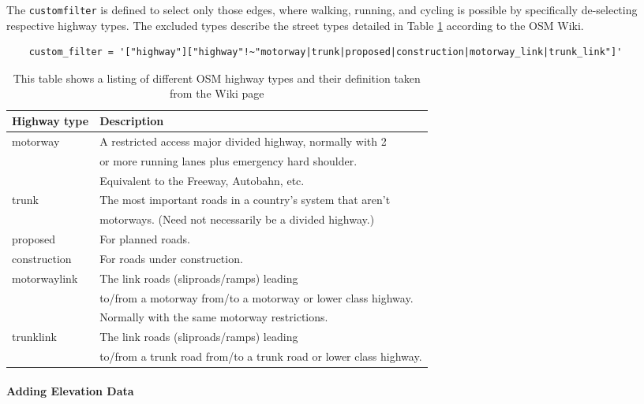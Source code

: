 The \texttt{custom\textunderscore filter} is defined to select only those edges, where walking, running, and cycling is possible by specifically de-selecting respective highway types.
The excluded types describe the street types detailed in Table \ref{tab:osmHighwayTypes} according to the OSM Wiki.

\begin{lstlisting}
	custom_filter = '["highway"]["highway"!~"motorway|trunk|proposed|construction|motorway_link|trunk_link"]'
\end{lstlisting}

\begin{table}
	\centering
	\begin{tabular}{l|l}
		Highway type & Description\\
		\hline
		motorway & A restricted access major divided highway, normally with 2\\ 
		& or more running lanes plus emergency hard shoulder.\\
		& Equivalent to the Freeway, Autobahn, etc. \\
		trunk & The most important roads in a country's system that aren't \\
		& motorways. (Need not necessarily be a divided highway.) \\
		proposed & For planned roads. \\
		construction & For roads under construction. \\
		motorway\textunderscore link & The link roads (sliproads/ramps) leading\\
		& to/from a motorway from/to a motorway or lower class highway. \\
		& Normally with the same motorway restrictions. \\
		trunk\textunderscore link & The link roads (sliproads/ramps) leading \\
		& to/from a trunk road from/to a trunk road or lower class highway. 
	\end{tabular}
	\caption[OSM highway types]{This table shows a listing of different OSM highway types and their definition taken from the Wiki page\protect\footnotemark}
	\label{tab:osmHighwayTypes}
\end{table}



\paragraph{Adding Elevation Data}

